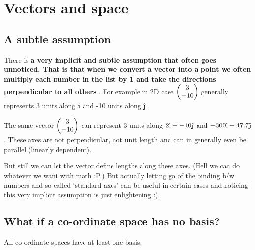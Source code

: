 \documentclass[../main.tex]{subfiles}
\begin{document}
\chapter{Vectors and space}

\section{A subtle assumption}
There is \textbf{a very implicit and subtle assumption that often goes unnoticed. That is that when we convert a vector into a point we often multiply each number in the list by 1 and take the directions perpendicular to all others} . For example in 2D case $ \blockcomment{Column-Vector: 3, -10} \begin{pmatrix} 3 \\  -10 \end{pmatrix} $ generally represents 3 units along $ \ihat $ and -10 units along $ \jhat $.

The same vector $ \blockcomment{Column-Vector: 3, -10} \begin{pmatrix} 3 \\  -10 \end{pmatrix} $ can represent 3 units along $ 2\ihat + -40\jhat $ and $ -300\ihat + 47.7\jhat $. These axes are not perpendicular, not unit length and can in generally even be parallel (linearly dependent).

But still we can let the vector define lengths along these axes. (Hell we can do whatever we want with math :P.) But actually letting go of the binding b/w numbers and so called `standard axes' can be useful in certain cases and noticing this very implicit assumption is just enlightening :).

\section{What if a co-ordinate space has no basis?}
\begin{theorem}
All co-ordinate spaces have at least one basis.
\end{theorem}
\end{document}
